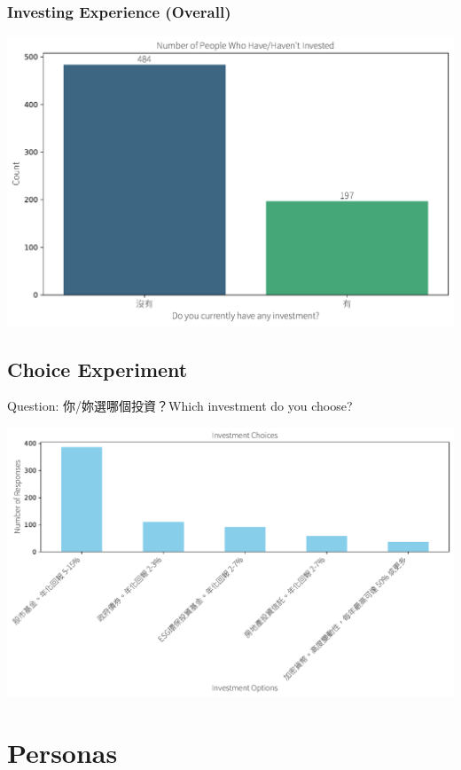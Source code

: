 \documentclass[
  letterpaper,
  DIV=11,
  numbers=noendperiod]{scrartcl}
\begin{document}
\subsubsection{Investing Experience
(Overall)}\label{investing-experience-overall}

\includegraphics{_thesis_files/figure-pdf/cell-80-output-1.pdf}

\subsection{Choice Experiment}\label{choice-experiment}

Question: 你/妳選哪個投資？Which investment do you choose?

\includegraphics{_thesis_files/figure-pdf/cell-81-output-1.pdf}

\newpage

\section{Personas}\label{personas}
\end{document}
